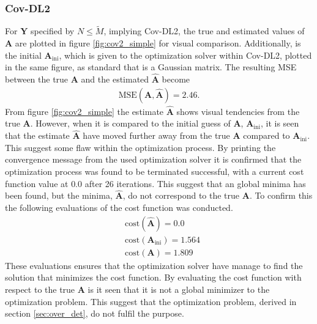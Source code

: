 \subsubsection{Cov-DL2}
For $\mathbf{Y}$ specified by $N \leq \widetilde{M}$, implying Cov-DL2, the true and estimated values of $\mathbf{A}$ are plotted in figure \ref{fig:cov2_simple} for visual comparison. 
Additionally, is the initial $\mathbf{A}_{\text{ini}}$, which is given to the optimization solver within Cov-DL2,  plotted in the same figure, as standard that is a Gaussian matrix.  
The resulting MSE between the true $\mathbf{A}$ and the estimated $\hat{\mathbf{A}}$ become 
\begin{align*}
\text{MSE}(\mathbf{A}, \hat{\mathbf{A}}) = 2.46.
\end{align*}
From figure \ref{fig:cov2_simple} the estimate $\hat{\mathbf{A}}$ shows visual tendencies from the true $\mathbf{A}$. 
However, when it is compared to the initial guess of $\textbf{A}$, $\mathbf{A}_{\text{ini}}$, it is seen that the estimate $\hat{\mathbf{A}}$ have moved further away from the true $\mathbf{A}$ compared to $\mathbf{A}_{\text{ini}}$. 
This suggest some flaw within the optimization process. 
By printing the convergence message from the used optimization solver it is confirmed that the optimization process was found to be terminated successful, with a current cost function value at $0.0$ after 26 iterations. 
This suggest that an global minima has been found, but the minima, $\hat{\mathbf{A}}$, do not correspond to the true $\mathbf{A}$.    
To confirm this the following evaluations of the cost function was conducted. 
\begin{align*}
&\text{cost}(\hat{\mathbf{A}}) = 0.0\\
&\text{cost}(\mathbf{A}_{\text{ini}}) = 1.564\\
&\text{cost}(\mathbf{A}) = 1.809
\end{align*}
These evaluations ensures that the optimization solver have manage to find the solution that minimizes the cost function. 
By evaluating the cost function with respect to the true $\mathbf{A}$ is it seen that it is not a global minimizer to the optimization problem. 
This suggest that the optimization problem, derived in section \ref{sec:over_det}, do not fulfil the purpose.    

